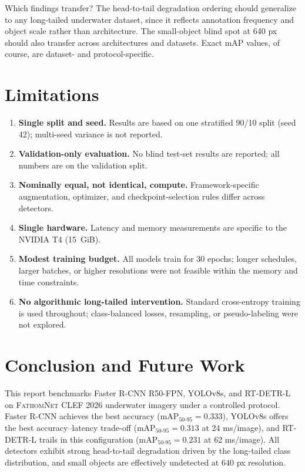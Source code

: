 \documentclass[11pt,a4paper]{article}
\newcommand{\dataset}{\textsc{FathomNet CLEF 2026}}
\begin{document}
Which findings transfer? The head-to-tail degradation ordering should generalize to any long-tailed underwater dataset, since it reflects annotation frequency and object scale rather than architecture. The small-object blind spot at 640 px should also transfer across architectures and datasets. Exact mAP values, of course, are dataset- and protocol-specific.

\section{Limitations}
\label{sec:limitations}

\begin{enumerate}[leftmargin=*]
  \item \textbf{Single split and seed.} Results are based on one stratified 90/10 split (seed 42); multi-seed variance is not reported.
  \item \textbf{Validation-only evaluation.} No blind test-set results are reported; all numbers are on the validation split.
  \item \textbf{Nominally equal, not identical, compute.} Framework-specific augmentation, optimizer, and checkpoint-selection rules differ across detectors.
  \item \textbf{Single hardware.} Latency and memory measurements are specific to the NVIDIA T4 (15~GiB).
  \item \textbf{Modest training budget.} All models train for 30 epochs; longer schedules, larger batches, or higher resolutions were not feasible within the memory and time constraints.
  \item \textbf{No algorithmic long-tailed intervention.} Standard cross-entropy training is used throughout; class-balanced losses, resampling, or pseudo-labeling were not explored.
\end{enumerate}

\section{Conclusion and Future Work}
\label{sec:conclusion}

This report benchmarks Faster R-CNN R50-FPN, YOLOv8s, and RT-DETR-L on \dataset{} underwater imagery under a controlled protocol. Faster R-CNN achieves the best accuracy (mAP$_{50\text{-}95}=0.333$), YOLOv8s offers the best accuracy--latency trade-off (mAP$_{50\text{-}95}=0.313$ at 24 ms/image), and RT-DETR-L trails in this configuration (mAP$_{50\text{-}95}=0.231$ at 62 ms/image). All detectors exhibit strong head-to-tail degradation driven by the long-tailed class distribution, and small objects are effectively undetected at $640$ px resolution.
\end{document}
